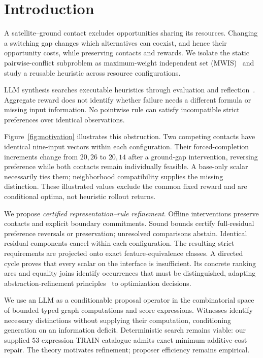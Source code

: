 \section{Introduction}
\label{sec:introduction}
A satellite--ground contact excludes opportunities sharing its resources.
Changing a switching gap changes which alternatives can coexist, and hence
their opportunity costs, while preserving contacts and rewards.
We isolate the static pairwise-conflict subproblem as maximum-weight
independent set (MWIS)~\cite{augenstein2016optimal,levinson2025optimal}
and study a reusable heuristic across resource configurations.

LLM synthesis searches executable heuristics through evaluation and
reflection~\cite{romeraparedes2024funsearch,liu2024eoh,ye2024reevo}.
Aggregate reward does not identify whether failure needs a different formula
or missing input information. No pointwise rule can satisfy incompatible
strict preferences over identical observations.

Figure~\ref{fig:motivation} illustrates this obstruction. Two competing contacts
have identical nine-input vectors within each configuration. Their
forced-completion increments change from $20,26$ to $20,14$ after a ground-gap
intervention, reversing preference while both contacts remain individually
feasible. A base-only scalar necessarily ties them; neighborhood compatibility
supplies the missing distinction. These illustrated values exclude the common
fixed reward and are conditional optima, not heuristic rollout returns.

We propose \emph{certified representation--rule refinement}. Offline interventions
preserve contacts and explicit boundary commitments. Sound bounds certify
full-residual preference reversals or preservation; unresolved comparisons abstain.
Identical residual components cancel within each configuration. The resulting
strict requirements are projected onto exact feature-equivalence classes.
A directed cycle proves that every scalar on the interface is insufficient.
Its concrete ranking arcs and equality joins identify occurrences that must be
distinguished, adapting abstraction-refinement
principles~\cite{clarke2000cegar,frances2021policies} to optimization decisions.

We use an LLM as a conditionable proposal operator in the combinatorial space
of bounded typed graph computations and score expressions. Witnesses identify
necessary distinctions without supplying their computation, conditioning
generation on an information deficit. Deterministic search remains viable:
our supplied 53-expression TRAIN catalogue admits exact minimum-additive-cost
repair. The theory motivates refinement; proposer efficiency remains empirical.

